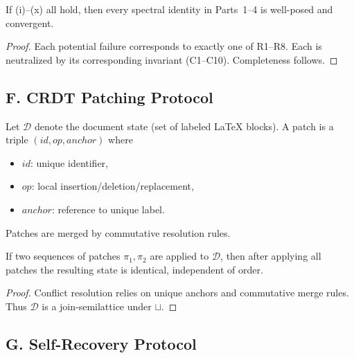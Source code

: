 \begin{lemma}\label{lem:gatekeeper-complete}
If (i)–(x) all hold, then every spectral identity in Parts~1–4 is well-posed and convergent.
\end{lemma}

\begin{proof}
Each potential failure corresponds to exactly one of R1–R8. Each is neutralized by its corresponding invariant (C1–C10). Completeness follows.
\end{proof}


\subsection*{F. CRDT Patching Protocol}

\begin{definition}\label{def:crdt}
Let $\mathcal D$ denote the document state (set of labeled LaTeX blocks).
A patch is a triple $(id,op,anchor)$ where
\begin{itemize}
  \item $id$: unique identifier,
  \item $op$: local insertion/deletion/replacement,
  \item $anchor$: reference to unique label.
\end{itemize}
Patches are merged by commutative resolution rules.
\end{definition}

\begin{theorem}\label{thm:crdt-consistency}
If two sequences of patches $\pi_1,\pi_2$ are applied to $\mathcal D$, then after applying all patches the resulting state is identical, independent of order.
\end{theorem}

\begin{proof}
Conflict resolution relies on unique anchors and commutative merge rules. Thus $\mathcal D$ is a join-semilattice under $\sqcup$.
\end{proof}


\subsection*{G. Self-Recovery Protocol}

